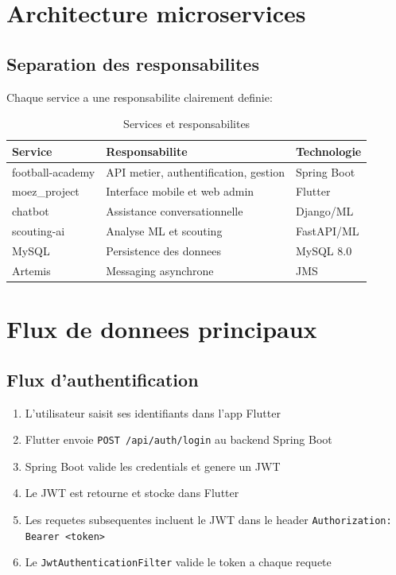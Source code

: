 \section{Architecture microservices}

\subsection*{Separation des responsabilites}

Chaque service a une responsabilite clairement definie:

\begin{table}[H]
\centering
\begin{tabular}{p{} p{} p{}}
\toprule
\textbf{Service} & \textbf{Responsabilite} & \textbf{Technologie} \\
\midrule
football-academy & API metier, authentification, gestion & Spring Boot \\
moez\_project & Interface mobile et web admin & Flutter \\
chatbot & Assistance conversationnelle & Django/ML \\
scouting-ai & Analyse ML et scouting & FastAPI/ML \\
MySQL & Persistence des donnees & MySQL 8.0 \\
Artemis & Messaging asynchrone & JMS \\
\bottomrule
\end{tabular}
\caption{Services et responsabilites}
\end{table}

\section{Flux de donnees principaux}

\subsection*{Flux d'authentification}

\begin{enumerate}[leftmargin=*]
  \item L'utilisateur saisit ses identifiants dans l'app Flutter
  \item Flutter envoie \texttt{POST /api/auth/login} au backend Spring Boot
  \item Spring Boot valide les credentials et genere un JWT
  \item Le JWT est retourne et stocke dans Flutter
  \item Les requetes subsequentes incluent le JWT dans le header \texttt{Authorization: Bearer <token>}
  \item Le \texttt{JwtAuthenticationFilter} valide le token a chaque requete
\end{enumerate}

